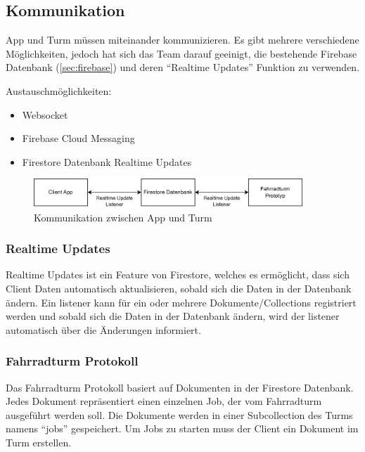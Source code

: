 \subsection{Kommunikation}

App und Turm müssen miteinander kommunizieren. Es gibt mehrere verschiedene Möglichkeiten, jedoch hat sich das Team darauf geeinigt, die bestehende Firebase Datenbank (\ref{sec:firebase}) und deren \enquote{Realtime Updates} Funktion zu verwenden.

Austauschmöglichkeiten:
\begin{itemize}
  \item Websocket
  \item Firebase Cloud Messaging
  \item Firestore Datenbank Realtime Updates
\end{itemize}

\begin{figure}[H]
  \centering
  \includegraphics[width=0.9\textwidth]{images/kommunikation.png}
  \caption{Kommunikation zwischen App und Turm}
  \label{fig:kommunikation}
\end{figure}

\subsubsection{Realtime Updates}

Realtime Updates ist ein Feature von Firestore, welches es ermöglicht, dass sich Client Daten automatisch aktualisieren, sobald sich die Daten in der Datenbank ändern. Ein \Gls{listener} kann für ein oder mehrere Dokumente/Collections registriert werden und sobald sich die Daten in der Datenbank ändern, wird der \Gls{listener} automatisch über die Änderungen informiert.

\subsubsection{Fahrradturm Protokoll}

Das Fahrradturm Protokoll basiert auf Dokumenten in der Firestore Datenbank. Jedes Dokument repräsentiert einen einzelnen Job, der vom Fahrradturm ausgeführt werden soll. Die Dokumente werden in einer Subcollection des Turms namens \enquote{jobs} gespeichert. Um Jobs zu starten muss der Client ein Dokument im Turm erstellen.

